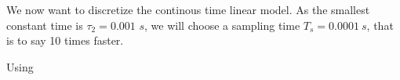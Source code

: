 We now want to discretize the continous time linear model. As the smallest constant time is $\tau_2=0.001$ $s$, we will choose a sampling time $T_s=0.0001\ s$, that is to say 10 times faster.

Using


